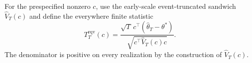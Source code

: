For the prespecified nonzero \(c\), use the early-scale event-truncated sandwich \(\widehat V_T(c)\) and define the everywhere finite statistic
\[
 T_T^{\mathrm{rqv}}(c)=
 \frac{\sqrt T\,c^\top(\widehat\theta_T-\theta^*)}
 {\sqrt{c^\top\widehat V_T(c)c}}.
\]
The denominator is positive on every realization by the construction of \(\widehat V_T(c)\).